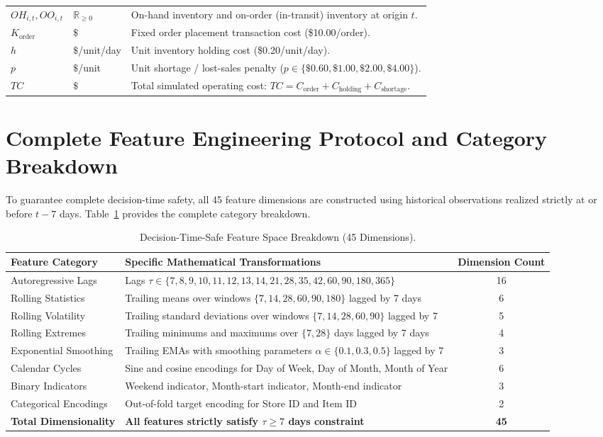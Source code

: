 \documentclass[11pt,a4paper]{article}
\begin{document}
\begin{table}[htbp]
\begin{tabular}{llp{8cm}}
$OH_{i,t}, OO_{i,t}$ & $\mathbb{R}_{\ge 0}$ & On-hand inventory and on-order (in-transit) inventory at origin $t$. \\
$K_{\text{order}}$ & $\$$ & Fixed order placement transaction cost (\$10.00/order). \\
$h$ & $\$$/unit/day & Unit inventory holding cost (\$0.20/unit/day). \\
$p$ & $\$$/unit & Unit shortage / lost-sales penalty ($p \in \{\$0.60, \$1.00, \$2.00, \$4.00\}$). \\
$TC$ & $\$$ & Total simulated operating cost: $TC = C_{\text{order}} + C_{\text{holding}} + C_{\text{shortage}}$. \\
\bottomrule
\end{tabular}
\end{table}

\section{Complete Feature Engineering Protocol and Category Breakdown}
\label{app:features}

To guarantee complete decision-time safety, all 45 feature dimensions are constructed using historical observations realized strictly at or before $t-7$ days. Table~\ref{tab:app_features} provides the complete category breakdown.

\begin{table}[htbp]
\centering
\small
\caption{Decision-Time-Safe Feature Space Breakdown (45 Dimensions).}
\label{tab:app_features}
\begin{tabular}{lp{9cm}c}
\toprule
\textbf{Feature Category} & \textbf{Specific Mathematical Transformations} & \textbf{Dimension Count} \\
\midrule
Autoregressive Lags & Lags $\tau \in \{7, 8, 9, 10, 11, 12, 13, 14, 21, 28, 35, 42, 60, 90, 180, 365\}$ & 16 \\
Rolling Statistics & Trailing means over windows $\{7, 14, 28, 60, 90, 180\}$ lagged by 7 days & 6 \\
Rolling Volatility & Trailing standard deviations over windows $\{7, 14, 28, 60, 90\}$ lagged by 7 & 5 \\
Rolling Extremes & Trailing minimums and maximums over $\{7, 28\}$ days lagged by 7 days & 4 \\
Exponential Smoothing & Trailing EMAs with smoothing parameters $\alpha \in \{0.1, 0.3, 0.5\}$ lagged by 7 & 3 \\
Calendar Cycles & Sine and cosine encodings for Day of Week, Day of Month, Month of Year & 6 \\
Binary Indicators & Weekend indicator, Month-start indicator, Month-end indicator & 3 \\
Categorical Encodings & Out-of-fold target encoding for Store ID and Item ID & 2 \\
\midrule
\textbf{Total Dimensionality} & \textbf{All features strictly satisfy $\tau \ge 7$ days constraint} & \textbf{45} \\
\bottomrule
\end{tabular}
\end{table}
\end{document}
